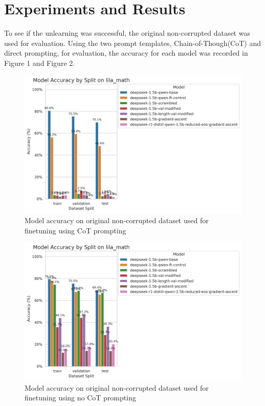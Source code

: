 \documentclass[10.5pt]{article}
\begin{document}
\section{Experiments and Results}
To see if the unlearning was successful, the original non-corrupted dataset was used for evaluation. Using the two prompt templates, Chain-of-Though(CoT) and direct prompting, for evaluation, the accuracy for each model was recorded in Figure 1 and Figure 2. 
\\
\begin{figure}[h]
    \centering
    \includegraphics[width=1\linewidth]{main_prompt_lila_math_accuracy_by_split_20250504_230401.png}
    \caption{Model accuracy on original non-corrupted dataset used for finetuning using CoT prompting}
    \label{fig:enter-label}
\end{figure}
\begin{figure}[h]
    \centering
    \includegraphics[width=1\linewidth]{new_prompt_lila_math_accuracy_by_split_20250505_192457.png}
    \caption{Model accuracy on original non-corrupted dataset used for finetuning using no CoT prompting}
    \label{fig:enter-label}
\end{figure}
\end{document}
